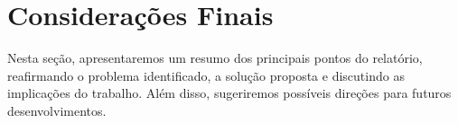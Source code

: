 \documentclass[12pt]{article}
\begin{document}
\section{Considerações Finais}
Nesta seção, apresentaremos um resumo dos principais pontos do relatório, reafirmando o problema identificado, a solução proposta e discutindo as implicações do trabalho. Além disso, sugeriremos possíveis direções para futuros desenvolvimentos. 



\end{document}
